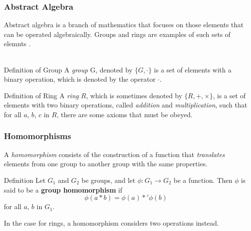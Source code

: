 \documentclass{beamer}
\begin{document}
\begin{frame}
\frametitle{Abstract Algebra}

Abstract algebra is a branch of mathematics that focuses on those elements that can be operated algebraically. Groups and rings are examples of such sets of elemnts \cite{CryptoStallings}. \\~\\
\begin{block}{Definition of Group}
A \emph{group} G, denoted by $\{ G, \cdot \}$ is a set of elements with a binary operation, which is denoted by the operator $\cdot$.
\end{block}

\begin{block}{Definition of Ring}
A \emph{ring} $R$, which is sometimes denoted by $\{R, +, \times \}$, is a set of elements with two binary operations, called \textit{addition} and \textit{multiplication}, such that for all $a$, $b$, $c$ in $R$, there are some axioms that must be obeyed.
\end{block}

\end{frame}


\begin{frame}
\frametitle{Homomorphisms}

A \emph{homomorphism} consists of the construction of a function that \emph{translates} elements from one group to another group with the same properties.

\begin{block}{Definition}
Let $G_{1}$ and $G_{2}$ be groups, and let $\phi: G_{1} \rightarrow G_{2}$ be a function. Then $\phi$ is said to be a \textbf{group homomorphism} if
\begin{equation}
\phi(a*b) = \phi(a) *' \phi(b)
\end{equation}
for all $a$, $b$ in $G_{1}$.
\end{block}

In the case for rings, a homomorphism considers two operations instead.

\end{frame}
\end{document}
